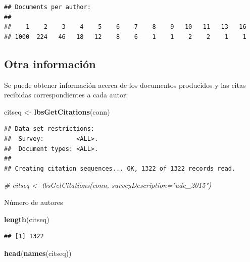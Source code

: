 \documentclass[
]{book}
\newenvironment{Shaded}{\begin{snugshade}}{\end{snugshade}}
\newcommand{\CommentTok}[1]{\textcolor[rgb]{0.56,0.35,0.01}{\textit{#1}}}
\newcommand{\KeywordTok}[1]{\textcolor[rgb]{0.13,0.29,0.53}{\textbf{#1}}}
\newcommand{\NormalTok}[1]{#1}
\newcommand{\StringTok}[1]{\textcolor[rgb]{0.31,0.60,0.02}{#1}}
\begin{document}
\begin{verbatim}
## Documents per author:
## 
##    1    2    3    4    5    6    7    8    9   10   11   13   16 
## 1000  224   46   18   12    8    6    1    1    2    2    1    1
\end{verbatim}

\hypertarget{otra-informaciuxf3n}{%
\subsection{Otra información}\label{otra-informaciuxf3n}}

Se puede obtener información acerca de los documentos producidos y las citas
recibidas correspondientes a cada autor:

\begin{Shaded}
\begin{Highlighting}[]
\NormalTok{citseq <-}\StringTok{ }\KeywordTok{lbsGetCitations}\NormalTok{(conn)}
\end{Highlighting}
\end{Shaded}

\begin{verbatim}
## Data set restrictions:
##  Survey:         <ALL>.
##  Document types: <ALL>.
## 
## Creating citation sequences... OK, 1322 of 1322 records read.
\end{verbatim}

\begin{Shaded}
\begin{Highlighting}[]
\CommentTok{# citseq <- lbsGetCitations(conn, surveyDescription="udc_2015")}
\end{Highlighting}
\end{Shaded}

Número de autores

\begin{Shaded}
\begin{Highlighting}[]
\KeywordTok{length}\NormalTok{(citseq) }
\end{Highlighting}
\end{Shaded}

\begin{verbatim}
## [1] 1322
\end{verbatim}

\begin{Shaded}
\begin{Highlighting}[]
\KeywordTok{head}\NormalTok{(}\KeywordTok{names}\NormalTok{(citseq))}
\end{Highlighting}
\end{Shaded}
\end{document}

